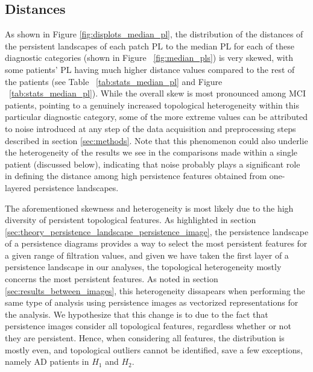 \documentclass{article}
\begin{document}
\subsection{Distances}\label{sec:disc-dist}


As shown in Figure \ref{fig:displots_median_pl}, the distribution of the distances of the persistent
landscapes of each patch PL to the median PL for each of these diagnostic categories (shown in
Figure ~\ref{fig:median_pls}) is very skewed, with some patients' PL having much higher distance
values compared to the rest of the patients (see Table ~\ref{tab:stats_median_pl} and Figure
~\ref{tab:stats_median_pl}). While the overall skew is most pronounced among MCI patients, pointing
to a genuinely increased topological heterogeneity within this particular diagnostic category, some
of the more extreme values can be attributed to noise introduced at any step of the data acquisition
and preprocessing steps described in section \ref{sec:methods}. Note that this phenomenon could also
underlie the heterogeneity of the results we see in the comparisons made within a single patient
(discussed below), indicating that noise probably plays a significant role in defining the distance
among high persistence features obtained from one-layered persistence landscapes.

The aforementioned skewness and heterogeneity is most likely due to the high diversity of persistent
topological features. As highlighted in section
\ref{sec:theory_persistence_landscape_persistence_image}, the persistence landscape of a persistence
diagrams provides a way to select the most persistent features for a given range of filtration
values, and given we have taken the first layer of a persistence landscape in our analyses, the
topological heterogeneity mostly concerns the most persistent features. As noted in section
\ref{sec:results_between_images}, this heterogeneity dissapears when performing the same type of
analysis using persistence images as vectorized representations for the analysis. We hypothesize
that this change is to due to the fact that persistence images consider all topological features,
regardless whether or not they are persistent. Hence, when considering all features, the
distribution is mostly even, and topological outliers cannot be identified, save a few exceptions,
namely AD patients in $H_1$ and $H_2$.
\end{document}
